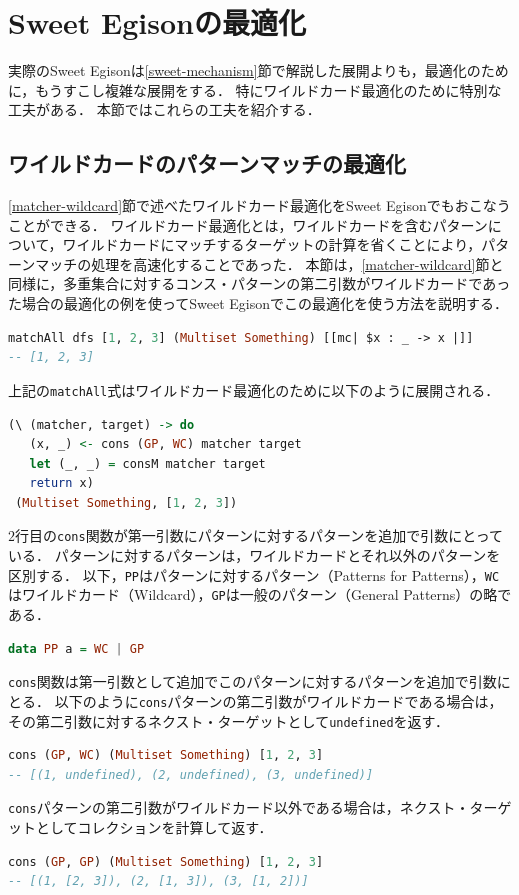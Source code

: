 \section{Sweet Egisonの最適化}\label{sweet-optimize}

実際のSweet Egisonは\ref{sweet-mechanism}節で解説した展開よりも，最適化のために，もうすこし複雑な展開をする．
特にワイルドカード最適化のために特別な工夫がある．
本節ではこれらの工夫を紹介する．

\subsection{ワイルドカードのパターンマッチの最適化}

\ref{matcher-wildcard}節で述べたワイルドカード最適化をSweet Egisonでもおこなうことができる．
ワイルドカード最適化とは，ワイルドカードを含むパターンについて，ワイルドカードにマッチするターゲットの計算を省くことにより，パターンマッチの処理を高速化することであった．
本節は，\ref{matcher-wildcard}節と同様に，多重集合に対するコンス・パターンの第二引数がワイルドカードであった場合の最適化の例を使ってSweet Egisonでこの最適化を使う方法を説明する．
\begin{lstlisting}[language=haskell,numbers=none]
matchAll dfs [1, 2, 3] (Multiset Something) [[mc| $x : _ -> x |]]
-- [1, 2, 3]
\end{lstlisting}
上記の\lstinline{matchAll}式はワイルドカード最適化のために以下のように展開される．
\begin{lstlisting}[language=haskell,numbers=none]
(\ (matcher, target) -> do
   (x, _) <- cons (GP, WC) matcher target
   let (_, _) = consM matcher target
   return x)
 (Multiset Something, [1, 2, 3])
\end{lstlisting}
$2$行目の\lstinline{cons}関数が第一引数にパターンに対するパターンを追加で引数にとっている．
パターンに対するパターンは，ワイルドカードとそれ以外のパターンを区別する．
以下，\lstinline{PP}はパターンに対するパターン（Patterns for Patterns），\lstinline{WC}はワイルドカード（Wildcard），\lstinline{GP}は一般のパターン（General Patterns）の略である．
\begin{lstlisting}[language=haskell,numbers=none]
data PP a = WC | GP
\end{lstlisting}
\lstinline{cons}関数は第一引数として追加でこのパターンに対するパターンを追加で引数にとる．
以下のように\lstinline{cons}パターンの第二引数がワイルドカードである場合は，その第二引数に対するネクスト・ターゲットとして\lstinline{undefined}を返す．
\begin{lstlisting}[language=haskell,numbers=none]
cons (GP, WC) (Multiset Something) [1, 2, 3]
-- [(1, undefined), (2, undefined), (3, undefined)]
\end{lstlisting}
\lstinline{cons}パターンの第二引数がワイルドカード以外である場合は，ネクスト・ターゲットとしてコレクションを計算して返す．
\begin{lstlisting}[language=haskell,numbers=none]
cons (GP, GP) (Multiset Something) [1, 2, 3]
-- [(1, [2, 3]), (2, [1, 3]), (3, [1, 2])]
\end{lstlisting}

